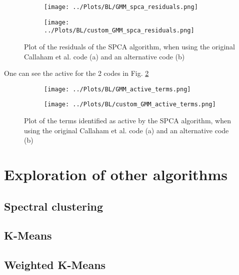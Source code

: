 \documentclass[12pt]{report} %
\begin{document}
\begin{figure}[htbp]
  \centering
  \begin{subfigure}[b]{0.45\textwidth}
      \texttt{[image: ../Plots/BL/GMM\_spca\_residuals.png]}
      \caption{}
  \end{subfigure}
  \hfill
  \begin{subfigure}[b]{0.45\textwidth}
      \texttt{[image: ../Plots/BL/custom\_GMM\_spca\_residuals.png]}
      \caption{}
  \end{subfigure}
  \caption{Plot of the residuals of the SPCA algorithm, when using the original Callaham et al. code (a) and an alternative code (b)}
  \label{fig:SPCA_residuals}
\end{figure}


One can see the active for the 2 codes in Fig. \ref{fig:active_terms}


\begin{figure}[htbp]
  \centering
  \begin{subfigure}[b]{0.45\textwidth}
      \texttt{[image: ../Plots/BL/GMM\_active\_terms.png]}
      \caption{}
  \end{subfigure}
  \hfill
  \begin{subfigure}[b]{0.45\textwidth}
      \texttt{[image: ../Plots/BL/custom\_GMM\_active\_terms.png]}
      \caption{}
  \end{subfigure}
  \caption{Plot of the terms identified as active by the SPCA algorithm, when using the original Callaham et al. code (a) and an alternative code (b)}
  \label{fig:active_terms}
\end{figure}


\section{Exploration of other algorithms}

\subsection{Spectral clustering}

\subsection{K-Means}

\subsection{Weighted K-Means}
\end{document}

